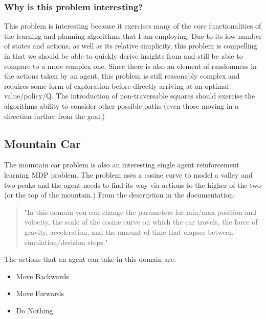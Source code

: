 \documentclass[11pt]{article}
\newcommand{\problemtwo}{Mountain Car}
\begin{document}
    \subsubsection{Why is this problem interesting?}
    This problem is interesting because it exercises many of the core functionalities of the learning and planning algorithms that I am employing.
    Due to its low number of states and actions, as well as its relative simplicity, this problem is compelling in that we should be able to
    quickly derive insights from and still be able to compare to a more complex one.
    Since there is also an element of randomness in the actions taken by an agent, this problem is still reasonably complex
    and requires some form of exploration before directly arriving at an optimal value/policy/Q.
    The introduction of non-traversable squares should exercise the algorithms ability to consider other possible paths
    (even those moving in a direction further from the goal.)

    \subsection{\problemtwo}
    The mountain car problem is also an interesting single agent reinforcement learning MDP problem.
    The problem uses a cosine curve to model a valley and two peaks and the agent needs to find its way via actions to the higher of the two (or the top of the mountain.)
    From the description in the documentation:
    \begin{quote}
        "In this domain you can change the parameters for min/max position and velocity, the scale of the cosine curve on which the car travels, the force of gravity, acceleration, and the amount of time that elapses between simulation/decision steps."\cite{Burlap20}
    \end{quote}
    The actions that an agent can take in this domain are:
    \begin{itemize}
        \item Move Backwards
        \item Move Forwards
        \item Do Nothing
    \end{itemize}
\end{document}

